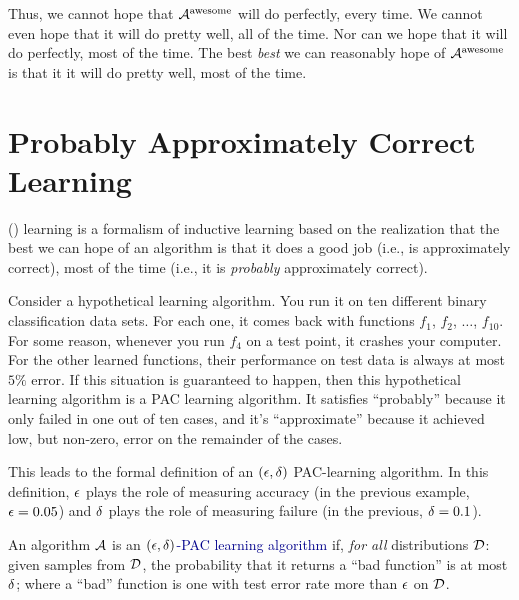 Thus, we cannot hope that $\mathcal{A}^{\text{awesome}}$ will do perfectly,
every time.  We cannot even hope that it will do pretty well, all of
the time.  Nor can we hope that it will do perfectly, most of the
time.  The best \emph{best} we can reasonably hope of
$\mathcal{A}^{\text{awesome}}$ is that it it will do pretty well, most of the
time.

\section{Probably Approximately Correct Learning}

 () learning is a
formalism of inductive learning based on the realization that the best
we can hope of an algorithm is that it does a good job (i.e., is
approximately correct), most of the time (i.e., it is \emph{probably}
approximately correct).

Consider a hypothetical learning algorithm.  You run it on ten
different binary classification data sets.  For each one, it comes
back with functions $f_1$, $f_2$, $\dots$, $f_{10}$.  For some reason,
whenever you run $f_4$ on a test point, it crashes your computer.  For
the other learned functions, their performance on test data is always
at most $5\%$ error.  If this situation is guaranteed to happen, then
this hypothetical learning algorithm is a PAC learning algorithm.  It
satisfies ``probably'' because it only failed in one out of ten cases,
and it's ``approximate'' because it achieved low, but non-zero, error
on the remainder of the cases.

This leads to the formal definition of an $(\epsilon,\delta)$ PAC-learning
algorithm.  In this definition, $\epsilon$ plays the role of measuring
accuracy (in the previous example, $\epsilon = 0.05$) and $\delta$ plays the
role of measuring failure (in the previous, $\delta = 0.1$).

\begin{definition}
  An algorithm $\mathcal{A}$ is an \textcolor{darkblue}{$(\epsilon,\delta)$-PAC
    learning algorithm} if, \emph{for all} distributions $\mathcal{D}$: given
  samples from $\mathcal{D}$, the probability that it returns a ``bad
  function'' is at most $\delta$; where a ``bad'' function is one with
  test error rate more than $\epsilon$ on $\mathcal{D}$.
\end{definition}


